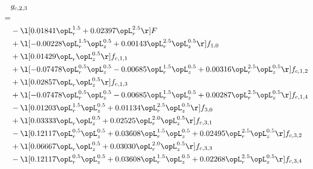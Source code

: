 \begin{alignat}{2} 
\label{eq:g_23_0} 
& g_{c,2,3} \nonumber \\ 
 = \\ 
& - \l[  0.01841 \opL_r^{1.5} +  0.02397 \opL_r^{2.5}  \r] F \nonumber \\ 
& + \l[  -0.00228 \opL_r^{1.5} \opL_z^{0.5} +  0.00143 \opL_r^{2.5} \opL_z^{0.5}  \r] f_{1,0} \nonumber \\ 
& + \l[  0.01429 \opL_r \opL_z^{0.5}  \r] f_{c,1,1} \nonumber \\ 
& + \l[  -0.07478 \opL_r^{0.5} \opL_z^{0.5}   -0.00685 \opL_r^{1.5} \opL_z^{0.5} +  0.00316 \opL_r^{2.5} \opL_z^{0.5}  \r] f_{c,1,2} \nonumber \\ 
& + \l[  0.02857 \opL_r \opL_z^{0.5}  \r] f_{c,1,3} \nonumber \\ 
& + \l[  -0.07478 \opL_r^{0.5} \opL_z^{0.5}   -0.00685 \opL_r^{1.5} \opL_z^{0.5} +  0.00287 \opL_r^{2.5} \opL_z^{0.5}  \r] f_{c,1,4} \nonumber \\ 
& - \l[  0.01203 \opL_r^{1.5} \opL_z^{0.5} +  0.01134 \opL_r^{2.5} \opL_z^{0.5}  \r] f_{3,0} \nonumber \\ 
& + \l[  0.03333 \opL_r \opL_z^{0.5} +  0.02525 \opL_r^{2.0} \opL_z^{0.5}  \r] f_{c,3,1} \nonumber \\ 
& - \l[  0.12117 \opL_r^{0.5} \opL_z^{0.5} +  0.03608 \opL_r^{1.5} \opL_z^{0.5} +  0.02495 \opL_r^{2.5} \opL_z^{0.5}  \r] f_{c,3,2} \nonumber \\ 
& + \l[  0.06667 \opL_r \opL_z^{0.5} +  0.03030 \opL_r^{2.0} \opL_z^{0.5}  \r] f_{c,3,3} \nonumber \\ 
& - \l[  0.12117 \opL_r^{0.5} \opL_z^{0.5} +  0.03608 \opL_r^{1.5} \opL_z^{0.5} +  0.02268 \opL_r^{2.5} \opL_z^{0.5}  \r] f_{c,3,4} \nonumber \\ 
\end{alignat} 


